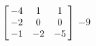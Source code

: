 {$\left[\hskip -3pt \begin{array}{ccc} -4&1&1\\  -2&0&0
\\  -1&-2&-5\end{array}\hskip -3pt \right]
$} 
{$-9$}



  


